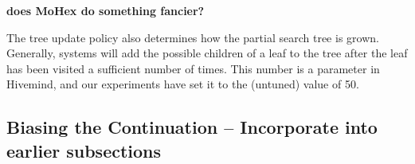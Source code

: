 \documentclass{acm_proc_article-sp}
\begin{document}
\textbf{does MoHex do something fancier?}

The tree update policy also determines how the partial search tree is grown.
Generally, systems will add the possible children of a leaf to the tree after the leaf has been visited a sufficient number of times.
This number is a parameter in Hivemind, and our experiments have set it to the (untuned) value of 50.


\subsection{Biasing the Continuation -- Incorporate into earlier subsections}\label{bias}
\end{document}
